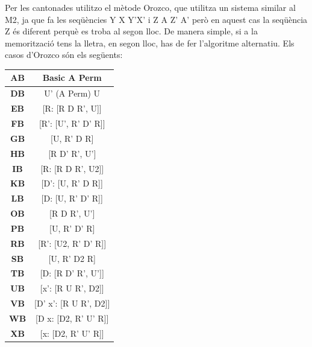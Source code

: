 Per les cantonades utilitzo el mètode Orozco, que utilitza un sistema similar al M2, ja que fa
les seqüències Y X Y'X' i Z A Z' A' però en aquest cas la seqüència Z és diferent perquè es
troba al segon lloc. De manera simple, si a la memorització tens la lletra, en segon lloc, has de
fer l'algoritme alternatiu. Els casos d'Orozco són els següents:

\begin{table}[h]
    \begin{minipage}{.5\linewidth}
        \centering
        \begin{tabular}{|c|c|} 
            \hline
            \textbf{AB} & Basic A Perm \\
            \hline
            \textbf{DB} & U' (A Perm) U \\
            \hline
            \textbf{EB} & [R: [R D R', U]] \\
            \hline
            \textbf{FB} & [R': [U', R' D' R]] \\
            \hline
            \textbf{GB} & [U, R' D R] \\
            \hline
            \textbf{HB} & [R D' R', U'] \\
            \hline
            \textbf{IB} & [R: [R D R', U2]] \\
            \hline
            \textbf{KB} & [D': [U, R' D R]] \\
            \hline
            \textbf{LB} & [D: [U, R' D' R]] \\
            \hline
            \textbf{OB} & [R D R', U'] \\
            \hline
            \textbf{PB} & [U, R' D' R] \\
            \hline
            \textbf{RB} & [R': [U2, R' D' R]] \\
            \hline
            \textbf{SB} & [U, R' D2 R] \\
            \hline
            \textbf{TB} & [D: [R D' R', U']] \\
            \hline
            \textbf{UB} & [x': [R U R', D2]] \\
            \hline
            \textbf{VB} & [D' x': [R U R', D2]] \\
            \hline
            \textbf{WB} & [D x: [D2, R' U' R]] \\
            \hline
            \textbf{XB} & [x: [D2, R' U' R]] \\
            \hline 
        \end{tabular}
    \end{minipage}

\end{table}

